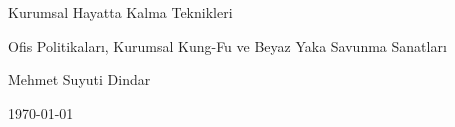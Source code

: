 \begin{titlepage}
\centering
{\Huge Kurumsal Hayatta Kalma Teknikleri \par}
\vspace{1cm}
{\Large Ofis Politikaları, Kurumsal Kung-Fu ve Beyaz Yaka Savunma Sanatları \par}
\vfill
{\large Mehmet Suyuti Dindar \par}
\vspace{1cm}
{\large \today \par}
\end{titlepage}
